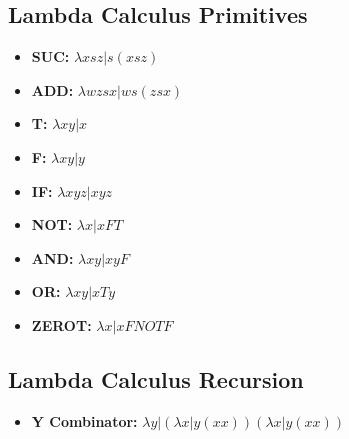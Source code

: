 \documentclass[landscape, letterpaper]{extarticle}
\theoremstyle{definition}
\begin{document}
\begin{multicols}{3}
    \subsection*{Lambda Calculus Primitives}
    \begin{itemize}[noitemsep,nolistsep]
        \item \textbf{SUC:} \(\lambda x s z | s(xsz)\)
        \item \textbf{ADD:} \(\lambda w z s x | ws(zsx)\)
        \item \textbf{T:} \(\lambda x y | x\)
        \item \textbf{F:} \(\lambda x y | y\)
        \item \textbf{IF:} \(\lambda x y z | x y z\)
        \item \textbf{NOT:} \(\lambda x | x F T\)
        \item \textbf{AND:} \(\lambda x y | xyF\)
        \item \textbf{OR:} \(\lambda x y | xTy\)
        \item \textbf{ZEROT:} \(\lambda x | x F NOT F\)
    \end{itemize}
    \subsection*{Lambda Calculus Recursion}
    \begin{itemize}[noitemsep,nolistsep]
        \item \textbf{Y Combinator: } \(\lambda y | (\lambda x | y (xx)) (\lambda x | y(xx))\)
    \end{itemize}


\end{multicols}
\end{document}
